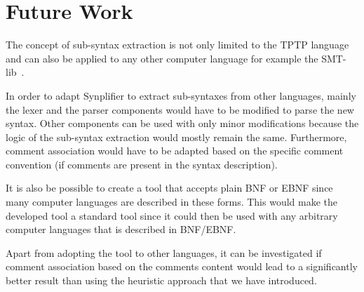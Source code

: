 %
%
%
%

\section{Future Work}\label{sec:FutureWork}

The concept of sub-syntax extraction is not only limited to the \ac{TPTP} language and can also be applied to any other computer language for example the SMT-lib~\cite{BFT-SMTLIB-17}.

In order to adapt \ac{Synplifier} to extract sub-syntaxes from other languages, mainly the lexer and the parser components would have to be modified to parse the new syntax. Other components can be used with only minor modifications because the logic of the sub-syntax extraction would mostly remain the same.
Furthermore, comment association would have to be adapted based on the specific comment convention (if comments are present in the syntax description).

It is also be possible to create a tool that accepts plain \ac{BNF} or \ac{EBNF} since many computer languages are described in these forms. This would make the developed tool a standard tool since it could then be used with any arbitrary computer languages that is described in \ac{BNF}/\ac{EBNF}.

Apart from adopting the tool to other languages, it can be investigated if comment association based on the comments content would lead to a significantly better result than using the heuristic approach that we have introduced.
